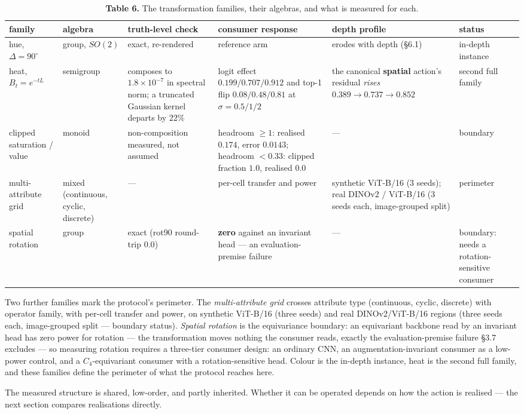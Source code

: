 \begin{table}[t]
\centering
\scriptsize
\caption*{\textbf{Table 6.} The transformation families, their algebras, and what is measured for each.}
\setlength{\tabcolsep}{2pt}
\begin{tabularx}{\textwidth}{@{}>{\raggedright\arraybackslash}X >{\raggedright\arraybackslash}X >{\raggedright\arraybackslash}X >{\raggedright\arraybackslash}X >{\raggedright\arraybackslash}X >{\raggedright\arraybackslash}X@{}}
\toprule
\textbf{family} & \textbf{algebra} & \textbf{truth-level check} & \textbf{consumer response} & \textbf{depth profile} & \textbf{status} \\
\midrule
hue, $\Delta=90^\circ$ & group, $SO(2)$ & exact, re-rendered & reference arm & erodes with depth (\S{}6.1) & in-depth instance \\
heat, $B_t=e^{-tL}$ & semigroup & composes to $1.8\times10^{-7}$ in spectral norm; a truncated Gaussian kernel departs by 22\% & logit effect $0.199/0.707/0.912$ and top-1 flip $0.08/0.48/0.81$ at $\sigma=0.5/1/2$ & the canonical \textbf{spatial} action's residual \textit{rises} $0.389\to0.737\to0.852$ & second full family \\
clipped saturation / value & monoid & non-composition measured, not assumed & headroom $\ge1$: realised $0.174$, error $0.0143$; headroom $<0.33$: clipped fraction $1.0$, realised $0.0$ & --- & boundary \\
multi-attribute grid & mixed (continuous, cyclic, discrete) & --- & per-cell transfer and power & synthetic ViT-B/16 (3 seeds); real DINOv2 / ViT-B/16 (3 seeds each, image-grouped split) & perimeter \\
spatial rotation & group & exact (rot90 round-trip $0.0$) & \textbf{zero} against an invariant head --- an evaluation-premise failure & --- & boundary: needs a rotation-sensitive consumer \\
\bottomrule
\end{tabularx}
\end{table}

Two further families mark the protocol's perimeter. The \textit{multi-attribute grid} crosses attribute type (continuous, cyclic, discrete) with operator family, with per-cell transfer and power, on synthetic ViT-B/16 (three seeds) and real DINOv2/ViT-B/16 regions (three seeds each, image-grouped split --- boundary status). \textit{Spatial rotation} is the equivariance boundary: an equivariant backbone read by an invariant head has zero power for rotation --- the transformation moves nothing the consumer reads, exactly the evaluation-premise failure \S{}3.7 excludes --- so measuring rotation requires a three-tier consumer design: an ordinary CNN, an augmentation-invariant consumer as a low-power control, and a $C_4$-equivariant consumer with a rotation-sensitive head. Colour is the in-depth instance, heat is the second full family, and these families define the perimeter of what the protocol reaches here.

The measured structure is shared, low-order, and partly inherited. Whether it can be operated depends on how the action is realised --- the next section compares realisations directly.

